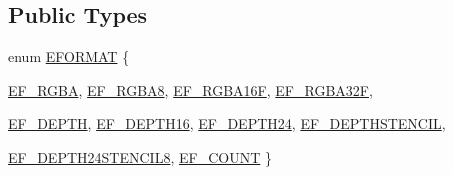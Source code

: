 \subsection*{Public Types}
\begin{CompactItemize}
\item 
enum \hyperlink{class_gr_renderbuffer_ebd137b0070a9c89e526afa508e2ad7a}{EFORMAT} \{ \par
\hyperlink{class_gr_renderbuffer_ebd137b0070a9c89e526afa508e2ad7a6df6a0c98b153e7cae6ac1ebc77e6c94}{EF\_\-RGBA}, 
\hyperlink{class_gr_renderbuffer_ebd137b0070a9c89e526afa508e2ad7a03ad579043db479c618638e2e2c685f3}{EF\_\-RGBA8}, 
\hyperlink{class_gr_renderbuffer_ebd137b0070a9c89e526afa508e2ad7a202a437f1def1946aa1c398a534222c3}{EF\_\-RGBA16F}, 
\hyperlink{class_gr_renderbuffer_ebd137b0070a9c89e526afa508e2ad7a948144f09229f1bd20e913cb83dc3733}{EF\_\-RGBA32F}, 
\par
\hyperlink{class_gr_renderbuffer_ebd137b0070a9c89e526afa508e2ad7a9fc819a7230d1c9f120f83872bb1db65}{EF\_\-DEPTH}, 
\hyperlink{class_gr_renderbuffer_ebd137b0070a9c89e526afa508e2ad7a1faa54370db5ea920543eba766bcdd32}{EF\_\-DEPTH16}, 
\hyperlink{class_gr_renderbuffer_ebd137b0070a9c89e526afa508e2ad7ac4a73c935678aec7259418788eee1694}{EF\_\-DEPTH24}, 
\hyperlink{class_gr_renderbuffer_ebd137b0070a9c89e526afa508e2ad7a8361959adca8d4e87bad86b4e3819333}{EF\_\-DEPTHSTENCIL}, 
\par
\hyperlink{class_gr_renderbuffer_ebd137b0070a9c89e526afa508e2ad7a52be76eacab826da90c78ffdae436ec0}{EF\_\-DEPTH24STENCIL8}, 
\hyperlink{class_gr_renderbuffer_ebd137b0070a9c89e526afa508e2ad7abc7d1871818a6b63352e02cffe273a21}{EF\_\-COUNT}
 \}

\end{CompactItemize}
